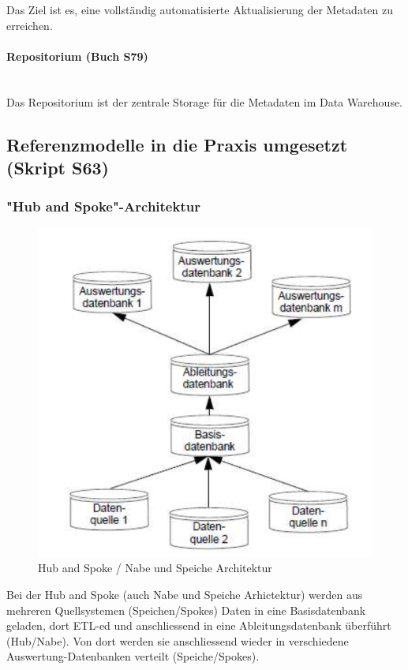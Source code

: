 \documentclass[a4paper, 11pt, nofootinbib]{article}
\begin{document}
Das Ziel ist es, eine vollständig automatisierte Aktualisierung der Metadaten zu erreichen.

\paragraph{Repositorium (Buch S79)}\mbox{}\\
Das Repositorium ist der zentrale Storage für die Metadaten im Data Warehouse.

\newpage

\subsection{Referenzmodelle in die Praxis umgesetzt (Skript S63)}
\subsubsection{"Hub and Spoke"-Architektur}
\begin{figure}
	\centering
	\includegraphics[keepaspectratio=true,height=16\baselineskip]{HubAndSpoke.PNG}
	\caption{Hub and Spoke / Nabe und Speiche Architektur}
	\label{fig:hubnspoke}
\end{figure}

Bei der Hub and Spoke (auch Nabe und Speiche Arhictektur) werden aus mehreren Quellsystemen (Speichen/Spokes) Daten in eine Basisdatenbank geladen, dort ETL-ed und anschliessend in eine Ableitungsdatenbank überführt (Hub/Nabe). Von dort werden sie anschliessend wieder in verschiedene Auswertung-Datenbanken verteilt (Speiche/Spokes).
\end{document}
